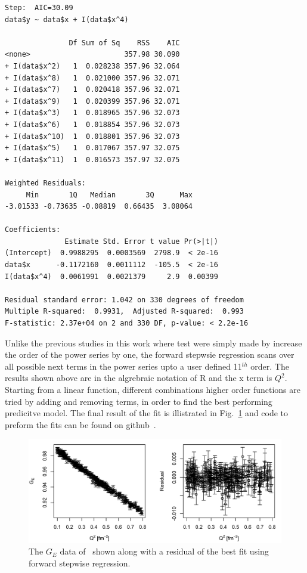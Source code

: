 \documentclass[10pt,aps,prc,twocolumn]{revtex4-1}
\begin{document}
\begin{appendix}
\begin{Verbatim}[fontsize=\footnotesize]
Step:  AIC=30.09
data$y ~ data$x + I(data$x^4)

               Df Sum of Sq    RSS    AIC
<none>                      357.98 30.090
+ I(data$x^2)   1  0.028238 357.96 32.064
+ I(data$x^8)   1  0.021000 357.96 32.071
+ I(data$x^7)   1  0.020418 357.96 32.071
+ I(data$x^9)   1  0.020399 357.96 32.071
+ I(data$x^3)   1  0.018965 357.96 32.073
+ I(data$x^6)   1  0.018854 357.96 32.073
+ I(data$x^10)  1  0.018801 357.96 32.073
+ I(data$x^5)   1  0.017067 357.97 32.075
+ I(data$x^11)  1  0.016573 357.97 32.075

Weighted Residuals:
     Min       1Q   Median       3Q      Max 
-3.01533 -0.73635 -0.08819  0.66435  3.08064 

Coefficients:
              Estimate Std. Error t value Pr(>|t|)    
(Intercept)  0.9988295  0.0003569  2798.9  < 2e-16 
data$x      -0.1172160  0.0011112  -105.5  < 2e-16 
I(data$x^4)  0.0061991  0.0021379     2.9  0.00399 

Residual standard error: 1.042 on 330 degrees of freedom
Multiple R-squared:  0.9931,  Adjusted R-squared:  0.993 
F-statistic: 2.37e+04 on 2 and 330 DF, p-value: < 2.2e-16

\end{Verbatim}

Unlike the previous studies in this work where test were simply made by increase the order of the power series
by one, the forward stepwsie regression scans over all possible next
terms in the power series upto a user defined 11$^{th}$ order.     The results shown above are in the algrebraic 
notation of R and the x term is $Q^2$.   Starting from a linear function, different combinations higher order functions
are tried by adding and removing terms, in order to find the best performing predicitve model.   The final result
of the fit is illistrated in Fig.~\ref{R-stepwise} and code to preform the fits can be found on github~\cite{Higinbotham:2016github}.

\begin{figure}[htb]
\includegraphics[width=\columnwidth]{Figure/R-stepwise.png}
\caption{The $G_E$ data of~\cite{Griffioen:2015hta} shown along with a residual of the best fit using forward stepwise regression.}
\label{R-stepwise}
\end{figure}


\end{appendix}
\end{document}
